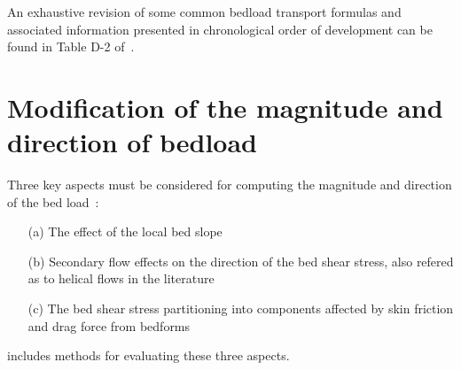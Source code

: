 \noindent
An exhaustive revision of some common bedload transport formulas and associated information presented in chronological order of development can be found in Table D-2 of~\cite{GarciaBook2006}.

\section{Modification of the magnitude and direction of bedload}\label{sec:corrections}
Three key aspects must be considered for computing the magnitude and direction of the bed load~\cite{Abad08}:
\begin{itemize}
\item[(a)] The effect of the local bed slope
\item[(b)] Secondary flow effects on the direction of the bed shear stress, also refered as to helical flows in the literature
\item[(c)] The bed shear stress partitioning into components affected by skin friction and drag force from bedforms
\end{itemize}
\noindent
\sisyphe{} includes methods for evaluating these three aspects.

